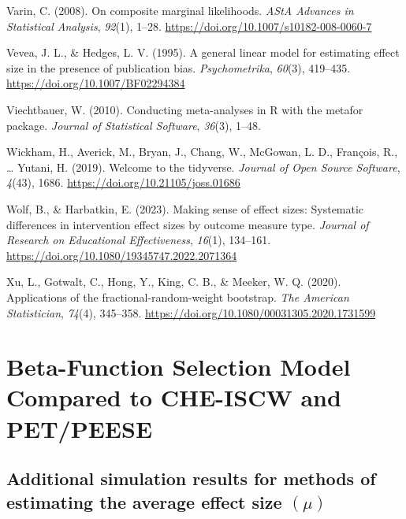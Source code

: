 \documentclass[
  american,
  man, donotrepeattitle,floatsintext]{apa7}
\newlength{\cslhangindent}
\newenvironment{CSLReferences}[2] %
 {\begin{list}{}{%
  \setlength{\itemindent}{0pt}
  \setlength{\leftmargin}{0pt}
  \setlength{\parsep}{0pt}
  \ifodd #1
   \setlength{\leftmargin}{\cslhangindent}
   \setlength{\itemindent}{-1\cslhangindent}
  \fi
  \setlength{\itemsep}{#2\baselineskip}}}
 {\end{list}}
\begin{document}
\begin{CSLReferences}{1}{0}
Varin, C. (2008). On composite marginal likelihoods. \emph{AStA Advances in Statistical Analysis}, \emph{92}(1), 1--28. \url{https://doi.org/10.1007/s10182-008-0060-7}

Vevea, J. L., \& Hedges, L. V. (1995). A general linear model for estimating effect size in the presence of publication bias. \emph{Psychometrika}, \emph{60}(3), 419--435. \url{https://doi.org/10.1007/BF02294384}

Viechtbauer, W. (2010). {Conducting meta-analyses in R with the metafor package}. \emph{Journal of Statistical Software}, \emph{36}(3), 1--48.

Wickham, H., Averick, M., Bryan, J., Chang, W., McGowan, L. D., François, R., \ldots{} Yutani, H. (2019). Welcome to the {tidyverse}. \emph{Journal of Open Source Software}, \emph{4}(43), 1686. \url{https://doi.org/10.21105/joss.01686}

Wolf, B., \& Harbatkin, E. (2023). Making sense of effect sizes: Systematic differences in intervention effect sizes by outcome measure type. \emph{Journal of Research on Educational Effectiveness}, \emph{16}(1), 134--161. \url{https://doi.org/10.1080/19345747.2022.2071364}

Xu, L., Gotwalt, C., Hong, Y., King, C. B., \& Meeker, W. Q. (2020). Applications of the fractional-random-weight bootstrap. \emph{The American Statistician}, \emph{74}(4), 345--358. \url{https://doi.org/10.1080/00031305.2020.1731599}

\end{CSLReferences}

\endgroup

\appendix


\section{Beta-Function Selection Model Compared to CHE-ISCW and PET/PEESE}\label{beta-function-selection-model-compared-to-che-iscw-and-petpeese}

\subsection{\texorpdfstring{Additional simulation results for methods of estimating the average effect size \((\mu)\)}{Additional simulation results for methods of estimating the average effect size (\textbackslash mu)}}\label{mu-simulation-results-main}
\end{document}
